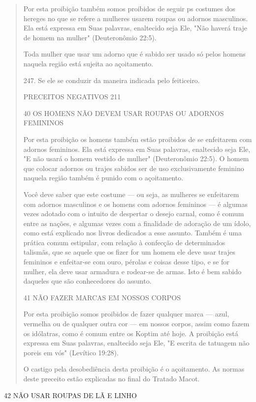 \begin{quote}
Por esta proibição também somos proibidos de seguir ps costumes dos
hereges no que se refere a mulheres usarem roupas ou adornos
masculi­nos. Ela está expressa em Suas palavras, enaltecido seja Ele,
"Não haverá traje de homem na mulher" (Deuteronômio 22:5).

Toda mulher que usar um adorno que é sabido ser usado só pelos homens
naquela região está sujeita ao açoitamento.

247. Se ele se conduzir da maneira indicada pelo feiticeiro.

PRECEITOS NEGATIVOS 211

40 OS HOMENS NÃO DEVEM USAR ROUPAS OU ADORNOS FEMININOS

Por esta proibição os homens também estão proibidos de se enfeita­rem
com adornos femininos. Ela está expressa em Suas palavras, enaltecido
se­ja Ele, "E não usará o homem vestido de mulher" (Deuteronômio 22:5).
O ho­mem que colocar adornos ou trajes sabidos ser de uso exclusivamente
femini­no naquela região também é punido com o açoitamento.

Você deve saber que este costume --- ou seja, as mulheres se enfeita­rem
com adornos masculinos e os homens com adornos femininos --- é algu­mas
vezes adotado com o intuito de despertar o desejo carnal, como é comum
entre as nações, e algumas vezes com a finalidade de adoração de um
ídolo, como está explicado nos livros dedicados a esse assunto. Também é
uma práti­ca comum estipular, com relação à confecção de determinados
talismãs, que se aquele que os fizer for um homem ele deve usar trajes
femininos e enfeitar-se com ouro, pérolas e coisas desse tipo, e se for
mulher, ela deve usar armadu­ra e rodear-se de armas. Isto é bem sabido
daqueles que são conhecedores do assunto.

41 NÃO FAZER MARCAS EM NOSSOS CORPOS

Por esta proibição somos proibidos de fazer qualquer marca --- azul,
vermelha ou de qualquer outra cor --- em nossos corpos, assim como fazem
os idólatras, como é comum entre os Koptim até hoje. A proibição está
expres­sa em Suas palavras, enaltecido seja Ele, "E escrita de tatuagem
não poreis em vós" (Levítico 19:28).

O castigo pela desobediência desta proibição é o açoitamento. As normas
deste preceito estão explicadas no final do Tratado Macot.
\end{quote}

42 NÃO USAR ROUPAS DE LÃ E LINHO


